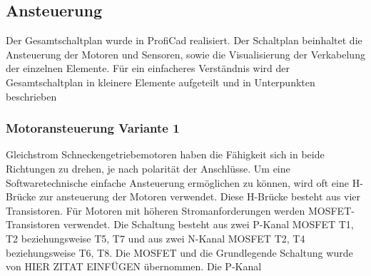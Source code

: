 \subsection{Ansteuerung}
Der Gesamtschaltplan wurde in ProfiCad realisiert. Der Schaltplan beinhaltet die Ansteuerung der Motoren und Sensoren, sowie die Visualisierung der Verkabelung der einzelnen Elemente.
Für ein einfacheres Verständnis wird der Gesamtschaltplan in kleinere Elemente aufgeteilt und in Unterpunkten beschrieben
\subsubsection{Motoransteuerung Variante 1}
Gleichstrom Schneckengetriebemotoren haben die Fähigkeit sich in beide Richtungen zu drehen, je nach polarität der Anschlüsse. Um eine Softwaretechnische einfache Ansteuerung ermöglichen zu können, wird oft eine H-Brücke zur ansteuerung der Motoren verwendet. Diese H-Brücke besteht aus vier Transistoren. Für Motoren mit höheren Stromanforderungen werden MOSFET-Transistoren verwendet. Die Schaltung besteht aus zwei P-Kanal MOSFET T1, T2 beziehungsweise T5, T7 und aus zwei N-Kanal MOSFET T2, T4 beziehungsweise T6, T8. Die MOSFET und die Grundlegende Schaltung wurde von HIER ZITAT EINFÜGEN übernommen. Die P-Kanal 
